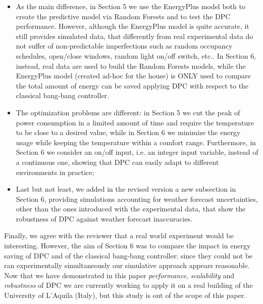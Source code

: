 \documentclass{article}
\begin{document}
\begin{enumerate}
\begin{itemize}
	\item As the main difference, in Section 5 we use the EnergyPlus model both to create the predictive model via Random Forests and to test the DPC performance. However, although the EnergyPlus model is quite accurate, it still provides simulated data, that differently from real experimental data do not suffer of non-predictable imperfections such as random occupancy schedules, open/close windows, random light on/off switch, etc.. In Section 6, instead, real data are used to build the Random Forests models, while the EnergyPlus model (created ad-hoc for the house) is ONLY used to compare the total amount of energy can be saved applying DPC with respect to the classical bang-bang controller.

	\item The optimization problems are different: in Section 5 we cut the peak of power consumption in a limited amount of time and require the temperature to be close to a desired value, while in Section 6 we minimize the energy usage while keeping the temperature within a comfort range. Furthermore, in Section 6 we consider an on/off input, i.e. an integer input variable, instead of a continuous one, showing that  DPC can easily adapt to different environments in practice;
	\item Last but not least, we added in the revised version a new subsection in Section 6, providing simulations accounting for weather forecast uncertainties, other than the ones introduced with the experimental data, that show the robustness of DPC against weather forecast inaccuracies.

\end{itemize}
Finally, we agree with the reviewer that a real world experiment would be interesting. However, the aim of Section 6 was to compare the impact in energy saving of DPC and of the classical bang-bang controller: since they could not be ran experimentally simultaneously our simulative approach appears reasonable. Now that we have demonstrated in this paper \textit{performance}, \textit{scalability} and \textit{robustness} of DPC we are currently working to apply it on a real building of the University of L'Aquila (Italy), but this study is out of the scope of this paper.

\end{enumerate}
\end{document}
